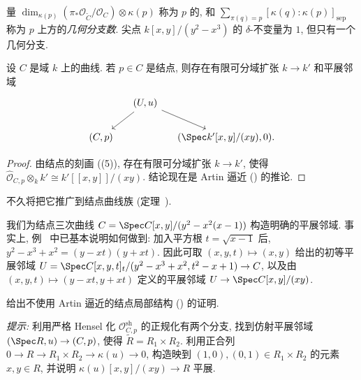 \begin{remark}\label{src:6.2.7}
量 $\dim_{\kappa(p)}(\pi_*\mathcal O_{\widetilde C}/\mathcal O_C)\otimes\kappa(p)$ 称为 $p$ 的, 和 $\sum_{\pi(q)=p}[\kappa(q):\kappa(p)]_{\mathrm{sep}}$ 称为 $p$ 上方的\textit{几何分支数}. 尖点 $k[x,\allowbreak y]/(y^2-x^3)$ 的 $\delta$-不变量为 $1$, 但只有一个几何分支.
\end{remark}
\newpage
\begin{proposition}[结点的局部结构]\label{src:6.2.8}
设 $C$ 是域 $k$ 上的曲线. 若 $p\in C$ 是结点, 则存在有限可分域扩张 $k\to\allowbreak k'$ 和平展邻域
\begin{equation}\label{src:6.2.9}
\begin{tikzcd}[column sep=small]
&(U,u)\arrow[dl]\arrow[dr]&\\
(C,p)&&(\Spec k'[x,y]/(xy),0).
\end{tikzcd}
\end{equation}
\end{proposition}
\begin{proof}
由结点的刻画 ((5)), 存在有限可分域扩张 $k\to\allowbreak k'$, 使得 $\widehat{\mathcal O}_{C,\allowbreak p}\otimes_k k'\cong k'[[x,\allowbreak y]]/(xy)$. 结论现在是 Artin 逼近 () 的推论.
\end{proof}
不久将把它推广到结点曲线族 (定理~).
\begin{example}\label{src:6.2.10}
我们为结点三次曲线 $C=\Spec\mathbb C[x,\allowbreak y]/(y^2-x^2(x-1))$ 构造明确的平展邻域. 事实上, 例~ 中已基本说明如何做到: 加入平方根 $t=\sqrt{x-1}$ 后, $y^2-x^3+x^2=(y-xt)(y+xt)$. 因此可取 $(x,\allowbreak y,\allowbreak t)\mapsto(x,\allowbreak y)$ 给出的初等平展邻域 $U=\Spec\mathbb C[x,\allowbreak y,\allowbreak t]_t/(y^2-x^3+x^2,\allowbreak t^2-x+1)\to\allowbreak C$, 以及由 $(x,\allowbreak y,\allowbreak t)\mapsto(y-xt,\allowbreak y+xt)$ 定义的平展邻域 $U\to\Spec\mathbb C[x,\allowbreak y]/(xy)$.
\end{example}
\begin{exercise}\label{src:6.2.11}
给出不使用 Artin 逼近的结点局部结构 () 的证明.

\textit{提示:} 利用严格 Hensel 化 $\mathcal O_{C,\allowbreak p}^{\mathrm{sh}}$ 的正规化有两个分支, 找到仿射平展邻域 $(\Spec R,\allowbreak u)\to(C,\allowbreak p)$, 使得 $\widetilde R=R_1\times R_2$. 利用正合列 $0\to\allowbreak R\to\allowbreak R_1\times R_2\to\kappa(u)\to0$, 构造映到 $(1,\allowbreak 0),\allowbreak (0,\allowbreak 1)\in R_1\times R_2$ 的元素 $x,\allowbreak y\in R$, 并说明 $\kappa(u)[x,\allowbreak y]/(xy)\to\allowbreak R$ 平展.
\end{exercise}
